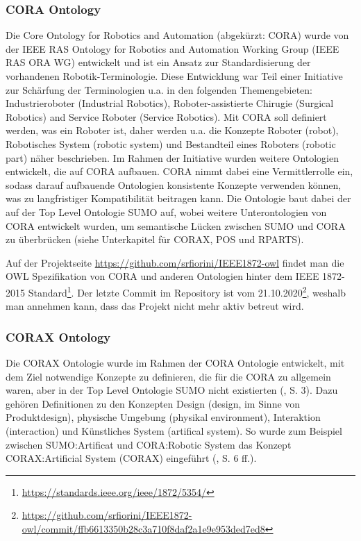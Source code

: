 \documentclass{article}
\begin{document}
\subsubsection{CORA Ontology}


Die Core Ontology for Robotics and Automation (abgekürzt: CORA) \cite{prestes2014core} wurde von der IEEE RAS Ontology for Robotics and Automation Working Group (IEEE RAS ORA WG) entwickelt und ist ein Ansatz zur Standardisierung der vorhandenen Robotik-Terminologie.
Diese Entwicklung war Teil einer Initiative zur Schärfung der Terminologien u.a. in den folgenden Themengebieten: Industrieroboter (Industrial Robotics), Roboter-assistierte Chirugie (Surgical Robotics) and Service Roboter (Service Robotics).
Mit CORA soll definiert werden, was ein Roboter ist, daher werden u.a. die Konzepte Roboter (robot), Robotisches System (robotic system) und Bestandteil eines Roboters (robotic part) näher beschrieben.
Im Rahmen der Initiative wurden weitere Ontologien entwickelt, die auf CORA aufbauen.
CORA nimmt dabei eine Vermittlerrolle ein, sodass darauf aufbauende Ontologien konsistente Konzepte verwenden können, was zu langfristiger Kompatibilität beitragen kann.
Die Ontologie baut dabei der auf der Top Level Ontologie SUMO auf, wobei weitere Unterontologien von CORA entwickelt wurden, um semantische Lücken zwischen SUMO und CORA zu überbrücken (siehe Unterkapitel für CORAX, POS und RPARTS).

Auf der Projektseite \url{https://github.com/srfiorini/IEEE1872-owl} findet man die OWL Spezifikation von CORA und anderen Ontologien hinter dem IEEE 1872-2015 Standard\footnote{\url{https://standards.ieee.org/ieee/1872/5354/}}. Der letzte Commit im Repository ist vom 21.10.2020\footnote{\url{https://github.com/srfiorini/IEEE1872-owl/commit/ffb6613350b28c3a710f8daf2a1e9e953ded7ed8}}, weshalb man annehmen kann, dass das Projekt nicht mehr aktiv betreut wird.

\subsubsection{CORAX Ontology}


Die CORAX Ontologie wurde im Rahmen der CORA Ontologie entwickelt, mit dem Ziel notwendige Konzepte zu definieren, die für die CORA zu allgemein waren, aber in der Top Level Ontologie SUMO nicht existierten (\cite{fiorini2015extensions}, S. 3).
Dazu gehören Definitionen zu den Konzepten Design (design, im Sinne von Produktdesign), physische Umgebung (physikal environment), Interaktion (interaction) und Künstliches System (artifical system).
So wurde zum Beispiel zwischen SUMO:Artificat und CORA:Robotic System das Konzept CORAX:Artificial System (CORAX) eingeführt (\cite{fiorini2015extensions}, S. 6 ff.).
\end{document}
